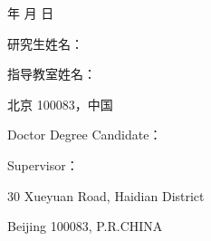 {\begin{titlepage}
\begin{center}
            \ThesisYear 年 \ThesisMonth 月 \ThesisDay 日

        \end{center}
    \end{titlepage}
    \newpage

    \pagestyle{empty}
    \begin{titlepage}
        \begin{center}
            \qquad
            \vspace{10mm}
            
            \centerline{\ThesisTitleCN} \par    %
            \vspace{10mm}
            
            \centerline{\ThesisSubTitleCN} \par
            \vspace{20mm}
            
            \centerline{\ThesisTitleEN} \par    %
            \vspace{10mm}
            
            \centerline{\ThesisSubTitleEN} \par
            \vspace{40mm}
            
            研究生姓名：\AuthorCN \par
            \vspace{3mm}
            指导教室姓名：\TeacherCN \par
            \vspace{3mm}
            \UniversityCN \SchoolCN \par
            \vspace{3mm}
            北京 100083，中国 \par
            \vspace{8mm}
            
            Doctor Degree Candidate：\AuthorEN \par
            \vspace{3mm}
            Supervisor：\TeacherEN \par
            \vspace{3mm}
            \SchoolEN \par
            \vspace{3mm}
            \UniversityEN \par
            \vspace{3mm}
            30 Xueyuan Road, Haidian District \par
            \vspace{3mm}
            Beijing 100083, P.R.CHINA
        

\end{center}
\end{titlepage}}
